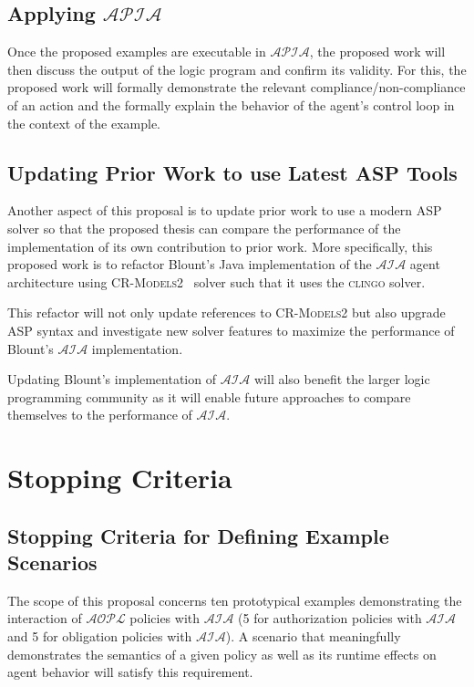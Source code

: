 \subsection{Applying $\mathcal{APIA}$}

Once the proposed examples are executable in $\mathcal{APIA}$, the proposed work will then discuss the output of the logic program and confirm its validity.
For this, the proposed work will formally demonstrate the relevant compliance/non-compliance of an action and the formally explain the behavior of the agent's control loop in the context of the example.

\subsection{Updating Prior Work to use Latest ASP Tools}

Another aspect of this proposal is to update prior work to use a modern ASP solver so that the proposed thesis can compare the performance of the implementation of its own contribution to prior work.
More specifically, this proposed work is to refactor Blount's Java implementation of the $\mathcal{AIA}$ agent architecture using \textsc{CR-Models2}~\citep{balduccini_cr-models_2007} solver such that it uses the \textsc{clingo} solver.

This refactor will not only update references to \textsc{CR-Models2} but also upgrade ASP syntax and investigate new solver features to maximize the performance of Blount's $\mathcal{AIA}$ implementation.

Updating Blount's implementation of $\mathcal{AIA}$ will also benefit the larger logic programming community as it will enable future approaches to compare themselves to the performance of $\mathcal{AIA}$.

\section{Stopping Criteria}

\subsection{Stopping Criteria for Defining Example Scenarios}

The scope of this proposal concerns ten prototypical examples demonstrating the interaction of $\mathcal{AOPL}$ policies with $\mathcal{AIA}$ (5 for authorization policies with $\mathcal{AIA}$ and 5 for obligation policies with $\mathcal{AIA}$).
A scenario that meaningfully demonstrates the semantics of a given policy as well as its runtime effects on agent behavior will satisfy this requirement.

